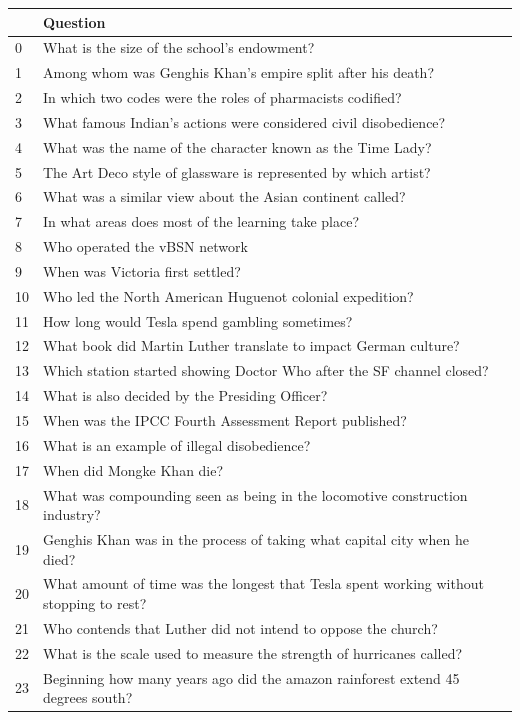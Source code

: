 \begin{tabular}{ll}
\toprule
 & Question \\
\midrule
0 & What is the size of the school's endowment? \\
1 & Among whom was Genghis Khan's empire split after his death? \\
2 & In which two codes were the roles of pharmacists codified? \\
3 & What famous Indian's actions were considered civil disobedience? \\
4 & What was the name of the character known as the Time Lady? \\
5 & The Art Deco style of glassware is represented by which artist? \\
6 & What was a similar view about the Asian continent called? \\
7 & In what areas does most of the learning take place? \\
8 & Who operated the vBSN network  \\
9 & When was Victoria first settled? \\
10 & Who led the North American Huguenot colonial expedition? \\
11 & How long would Tesla spend gambling sometimes? \\
12 & What book did Martin Luther translate to impact German culture? \\
13 & Which station started showing Doctor Who after the SF channel closed? \\
14 & What is also decided by the Presiding Officer? \\
15 & When was the IPCC Fourth Assessment Report published? \\
16 & What is an example of illegal disobedience? \\
17 & When did Mongke Khan die? \\
18 & What was compounding seen as being in the locomotive construction industry? \\
19 & Genghis Khan was in the process of taking what capital city when he died? \\
20 & What amount of time was the longest that Tesla spent working without stopping to rest? \\
21 & Who contends that Luther did not intend to oppose the church? \\
22 & What is the scale used to measure the strength of hurricanes called? \\
23 & Beginning how many years ago did the amazon rainforest extend 45 degrees south? \\

\end{tabular}
